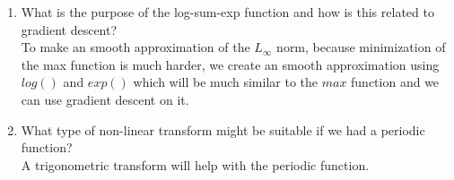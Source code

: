 \documentclass{article}
\def\ans#1{{\color{ans}#1}}
\begin{document}
\begin{enumerate}
{}
\item What is the purpose of the log-sum-exp function and how is this related to gradient descent?\\
\ans{
    To make an smooth approximation of the $L_\infty$ norm, because minimization of the max function is 
    much harder, we create an smooth approximation using $log()$ and $exp()$ which will be much similar 
    to the $max$ function and we can use gradient descent on it.
}
\item What type of non-linear transform might be suitable if we had a periodic function?\\
\ans{
    A trigonometric transform will help with the periodic function.
}
\end{enumerate}
\end{document}
